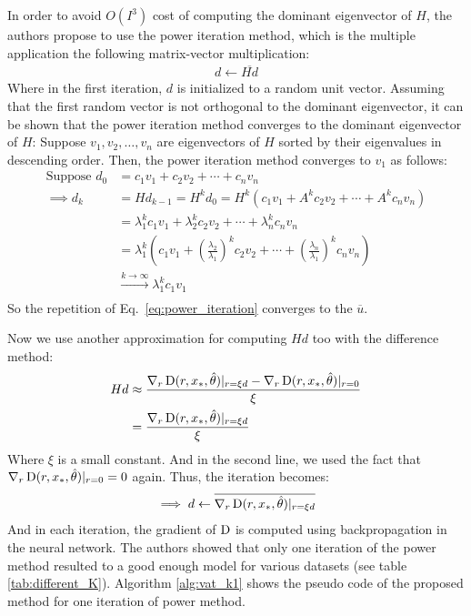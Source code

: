 \documentclass[paper=a4, fontsize=11pt]{scrartcl}
\numberwithin{equation}{section}		%
\numberwithin{figure}{section}			%
\numberwithin{table}{section}				%
\begin{document}
In order to avoid \(O(I^3)\) cost of computing the dominant eigenvector of \(H\), the authors propose to use the power iteration method, which is the multiple application the following matrix-vector multiplication:
\begin{align}
\label{eq:power_iteration}
d \gets \overline{Hd}
\end{align}
Where in the first iteration, \(d\) is initialized to a random unit vector.
Assuming that the first random vector is not orthogonal to the dominant eigenvector, it can be shown that the power iteration method converges to the dominant eigenvector of \(H\):
Suppose \(v_1, v_2, \ldots, v_n\) are eigenvectors of \(H\) sorted by their eigenvalues in descending order.
Then, the power iteration method converges to \(v_1\) as follows:
\begin{align}
\text{Suppose } d_0 &= c_1 v_1 + c_2 v_2 + \cdots + c_n v_n\\
\implies d_k &= Hd_{k-1} = H^k d_0 = H^k (c_1 v_1 + A^k c_2 v_2 + \cdots + A^k c_n v_n)\\
&= \lambda_1^k c_1 v_1 + \lambda_2^k c_2 v_2 + \cdots + \lambda_n^k c_n v_n\\
&= \lambda_1^k (c_1 v_1 + \left(\frac{\lambda_2}{\lambda_1}\right)^k c_2 v_2 + \cdots + \left(\frac{\lambda_n}{\lambda_1}\right)^k c_n v_n)\\
&\xrightarrow[]{k \to \infty} \lambda_1^k c_1 v_1
\end{align}
So the repetition of Eq.~\eqref{eq:power_iteration} converges to the \(\overline{u}\).

Now we use another approximation for computing \(Hd\) too with the difference method:
\begin{align}
  Hd &\approx \frac{\nabla_r \operatorname*{D}(r, x_*, \hat{\theta})|_{r=\xi d} - \nabla_r \operatorname*{D}(r, x_*, \hat{\theta})|_{r=0}}{\xi}\\
  &= \frac{\nabla_r \operatorname*{D}(r, x_*, \hat{\theta})|_{r=\xi d}}{\xi}
\end{align}
Where \(\xi\) is a small constant. And in the second line, we used the fact that \(\nabla_r \operatorname*{D}(r, x_*, \hat{\theta})|_{r=0} = 0\) again. Thus, the iteration becomes:
\begin{align}
\implies d \leftarrow \overline{\nabla_r \operatorname*{D}(r, x_*, \hat{\theta})|_{r=\xi d}}
\end{align}
And in each iteration, the gradient of \(\operatorname*{D}\) is computed using backpropagation in the neural network.
The authors showed that only one iteration of the power method resulted to a good enough model for various datasets (see table \ref{tab:different_K}).
Algorithm \ref{alg:vat_k1} shows the pseudo code of the proposed method for one iteration of power method.
\end{document}
